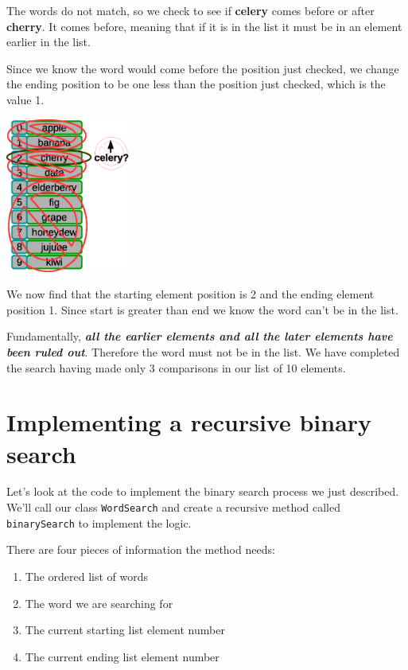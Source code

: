 The words do not match, so we check to see if \textbf{celery} comes before or after \textbf{cherry}. It comes before, meaning that if it is in the list it must be in an element earlier in the list. 

Since we know the word would come before the position just checked, we change the ending position to be one less than the position just checked, which is the value 1. 

\beforefig
\centerline{\includegraphics[height=2in]{figs2/recursion-binsearch-failure-6.eps}}
\afterfig

We now find that the starting element position is 2 and the ending element position 1. Since start is greater than end we know the word can't be in the list. 

Fundamentally, \textbf{\textit{all the earlier elements and all the later elements have been ruled out}}. Therefore the word must not be in the list. We have completed the search having made only 3 comparisons in our list of 10 elements.

\section{Implementing a recursive binary search}

Let's look at the code to implement the binary search process we just described. We'll call our class \texttt{WordSearch} and create a recursive method called \texttt{binarySearch} to implement the logic.


There are four pieces of information the method needs:

\begin{enumerate}
	\item The ordered list of words
	\item The word we are searching for
	\item The current starting list element number
	\item The current ending list element number
\end{enumerate}

